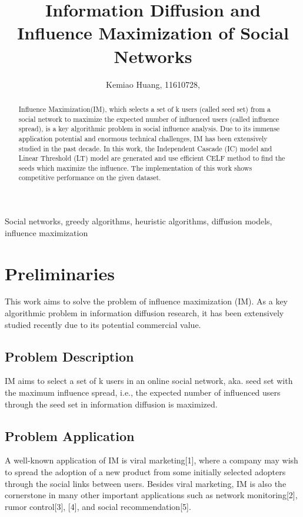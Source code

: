 \documentclass[9pt,shortpaper,twoside,web]{ieeecolor}
\begin{document}
\title{\bigskip\bigskip Information Diffusion and Influence Maximization of Social Networks}
\author{Kemiao Huang, 11610728, }

\maketitle

\begin{abstract}
Influence Maximization(IM), which selects a set of k users (called seed set) from a social network to maximize the expected number of influenced users (called influence spread), is a key algorithmic problem in social influence analysis. Due to its immense application potential and enormous technical challenges, IM has been extensively studied in the past decade. In this work, the Independent Cascade (IC) model and Linear Threshold (LT) model are generated and use efficient CELF method to find the seeds which maximize the influence. The implementation of this work shows competitive performance on the given dataset. 
\end{abstract}

\begin{IEEEkeywords}
Social networks, greedy algorithms, heuristic algorithms, diffusion models, influence maximization
\end{IEEEkeywords}
\bigskip
\section{Preliminaries}
This work aims to solve the problem of influence maximization (IM). As a key algorithmic problem in information diffusion research, it has been extensively studied recently due to its potential commercial value.

\subsection{Problem Description}
IM aims to select a set of k users in an online social network, aka. seed set with the maximum influence spread, i.e., the expected number of influenced users through the seed set in information diffusion is maximized. 
\subsection{Problem Application}
A well-known application of IM is viral marketing[1], where a company may wish to spread the adoption of a new product from some initially selected adopters through the social links between users. Besides viral marketing, IM is also the cornerstone in many other important applications such as network monitoring[2], rumor control[3], [4], and social recommendation[5].  
\bigskip
\end{document}
